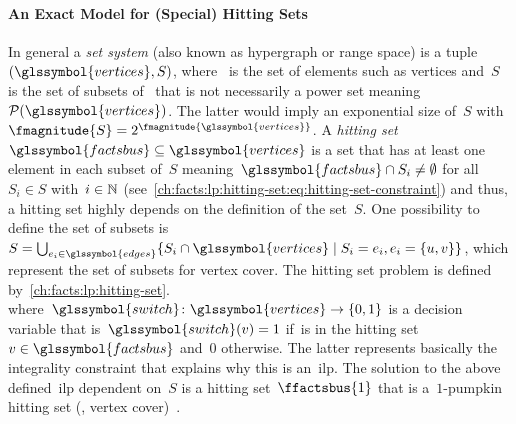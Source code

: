 \paragraph{An Exact Model for (Special) Hitting Sets}
% 
In general a \emph{set system} (also known as hypergraph or range space) is a
tuple~$(\glssymbol{vertices},S)$, where~ is the set of
elements such as vertices and~$S$ is the set of subsets of~
that is not necessarily a power set meaning~$\mathcal P(\glssymbol{vertices})$.
The latter would imply an exponential size of~$S$ with~$\fmagnitude{S} =
2^{\fmagnitude{\glssymbol{vertices}}}$. A \emph{hitting
set}~$\glssymbol{factsbus}\subseteq\glssymbol{vertices}$ is a set that has at
least one element in each subset of~$S$ meaning~$\glssymbol{factsbus}\cap
S_i\ne\emptyset$ for all~$S_i\in S$ with~$i\in\mathbb{N}$
(see~\cref{ch:facts:lp:hitting-set:eq:hitting-set-constraint}) and thus, a
hitting set highly depends on the definition of the set~$S$. One possibility to
define the set of subsets is~$
S 
= 
\bigcup_{\edge_i\in\glssymbol{edges}}
\{
S_i\cap\glssymbol{vertices}
\mid 
S_i 
=  
\edge_i,
\edge_i
=
\{\vertexa,\vertexb\}
\}$, which represent the set of subsets for vertex cover. The hitting set
problem is defined by~\cref{ch:facts:lp:hitting-set}.
% 
\begin{subequations}%
    \label{ch:facts:lp:hitting-set}%
\end{subequations}%
% 
where~$\glssymbol{switch}\colon\glssymbol{vertices}\to\{0,1\}$ is a decision
variable that is~$\glssymbol{switch}(\vertex) = 1$ if~\vertex is in the hitting
set~$\vertex\in\glssymbol{factsbus}$ and~$0$ otherwise. The latter represents
basically the integrality constraint that explains why this is an~\gls{ilp}. The
solution to the above defined~\gls{ilp} dependent on~$S$ is a hitting
set~$\ffactsbus{1}$ that is a~$1$-pumpkin hitting set (\ie, vertex
cover)~\parencite[p.60]{Cyg15}.

